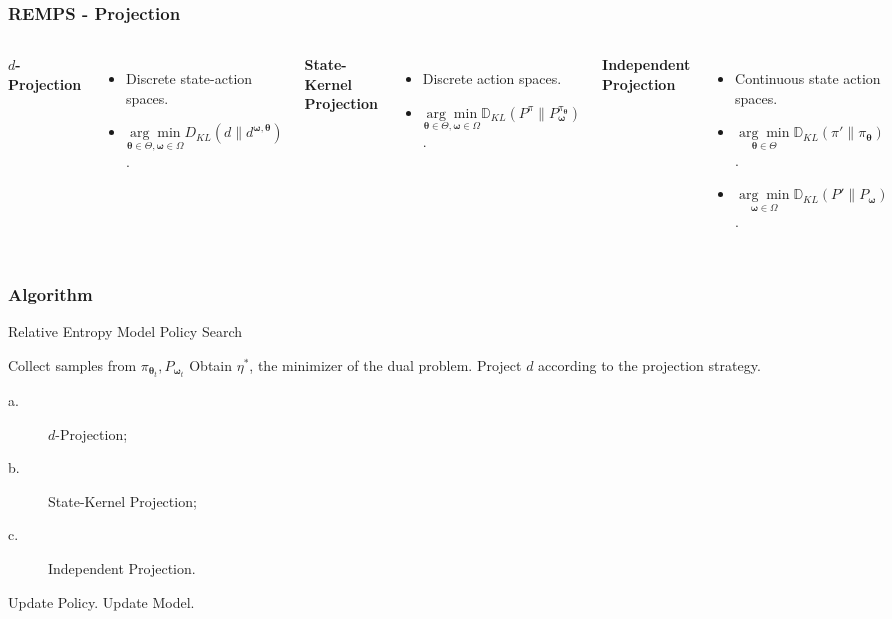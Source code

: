 \documentclass[english,aspectratio=1610]{beamer}
\theoremstyle{mystyle}
\theoremstyle{mystyle}
\theoremstyle{mystyle}
\begin{document}
\begin{frame}
	\frametitle{REMPS - Projection}
	\begin{columns}[T]
\centering
\textbf{$d$-Projection}
\vspace{0.3cm}
\begin{itemize}
\item Discrete state-action spaces.
\item $\underset{\bm{\theta} \in \Theta, \bm{\omega} \in \Omega}{\arg \min} D_{KL} \left(d \| d^{\bm{\omega}, \bm{\theta}}\right)$.
\end{itemize}
\centering
\textbf{State-Kernel Projection}
\vspace{0.3cm}
\begin{itemize}
\item Discrete action spaces.
\item $\underset{\bm{\theta} \in \Theta, \bm{\omega} \in \Omega}{\arg \min} \mathbb{D}_{KL}(P^{\pi} \| P_{\bm{\omega}}^{\pi_{\bm{\theta}}})$.
\end{itemize}
\centering
\textbf{Independent Projection}
\vspace{0.3cm}
\begin{itemize}
\item Continuous state action spaces.
\item $\underset{\bm{\theta} \in \Theta}{\arg \min} \mathbb{D}_{KL} (\pi' \| \pi_{\bm{\theta}})$.
\item $\underset{\bm{\omega} \in \Omega}{\arg \min} \mathbb{D}_{KL} (P' \| P_{\bm{\omega}})$.
\end{itemize}
\end{columns}
\end{frame}

\begin{frame}
	\frametitle{Algorithm}
	\begin{algorithm}[H]
  \caption{Relative Entropy Model Policy Search}
  \begin{algorithmic}[1]
  \State Collect samples from $\pi_{\bm{\theta}_t}, P_{\bm{\omega}_t}$
  \State Obtain $\eta^*$, the minimizer of the dual problem. 
  \State Project $d$ according to the projection strategy. 
  \begin{description}
  	\item[a.] $d$-Projection;
  	\item[b.] State-Kernel Projection;
    \item[c.] Independent Projection.
\end{description}
  \State Update Policy.
  \State Update Model.
  \EndFor \\
  \end{algorithmic}
\end{algorithm}
\end{frame}
\end{document}
